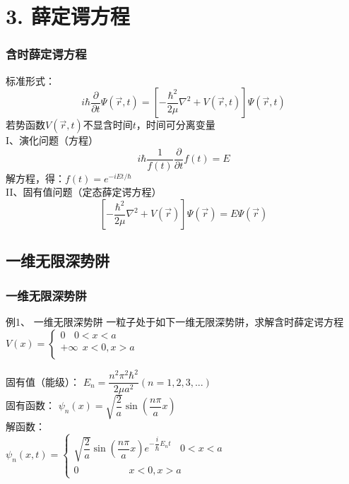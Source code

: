 \section{3. 薛定谔方程}

\begin{frame}
	\frametitle{含时薛定谔方程}
	标准形式：   
	 \begin{equation*}
		i\hbar \frac{\partial }{\partial t} \Psi (\overrightarrow{r},t ) =\left [ -\frac{\hbar^2}{2\mu }\nabla ^2 + V(\overrightarrow{r},t ) \right ]\Psi (\overrightarrow{r}, t ) 
	\end{equation*}
    若势函数$V(\vec{r},t ) $不显含时间$t$，时间可分离变量 \\
    I、演化问题（方程）  \[ \displaystyle  i\hbar \frac{1}{f(t)}  \frac{\partial }{\partial t} f(t)=E \]   
	解方程，得：$\displaystyle  f(t) =e^{-iEt/\hbar}$ \\  \vspace{0.6cm}
	II、固有值问题（定态薛定谔方程） \[\displaystyle   \left [ -\frac{\hbar^2}{2\mu }\nabla ^2 + V(\vec{r}) \right ]\Psi (\vec{r}) =E \Psi (\vec{r})  \]   
\end{frame}

\subsection{一维无限深势阱}
\begin{frame}
	\frametitle{一维无限深势阱}
	\begin{exampleblock} {例1、	一维无限深势阱}
	一粒子处于如下一维无限深势阱，求解含时薛定谔方程\\
 	{ $ \displaystyle 
	V(x)=\left \{ 
	\begin{array}{cccc}
		0	~~ ~~ 0<x<a \\  
		+\infty ~~x<0, x>a\\
	\end{array}
	\right.
	$} \\
	\end{exampleblock} %
	固有值（能级）：{ $E_n = \dfrac{n^2\pi^2\hbar^2}{2\mu a^2} (n=1,2,3,...)$} \\
    固有函数： $ \psi_n(x) = \sqrt{\dfrac{2}{a}} \sin(\dfrac{n\pi}{a}x)$ \\ 
    解函数： \\
	$ \displaystyle 
		\psi_n(x,t)= \left \{ 
		\begin{array}{cccc}
			\sqrt{\dfrac{2}{a}} \sin(\dfrac{n\pi}{a}x) e^{-\dfrac{i}{\hbar} E_n t} ~~~~   0<x<a \\
			0 ~~~~~~~~~~~~~~~~~~~~~~~ x<0,x>a  
		\end{array}
		\right.
	$
\end{frame}

